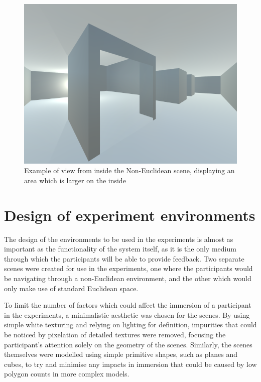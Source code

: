 	\begin{figure}[H]
		\includegraphics[width=1\textwidth]{Images/NE_View}
		\centering
		\caption{Example of view from inside the Non-Euclidean scene, displaying an area which is larger on the inside}
		\label{design:fig:game}
	\end{figure}

	\section[Environment Design]{Design of experiment environments}
	\label{design:design}

		The design of the environments to be used in the experiments is almost as important as the functionality of the system itself, as it is the only medium through which the participants will be able to provide feedback.
		Two separate scenes were created for use in the experiments, one where the participants would be navigating through a non-Euclidean environment, and the other which would only make use of standard Euclidean space. %

		To limit the number of factors which could affect the immersion of a participant in the experiments, a minimalistic aesthetic was chosen for the scenes.
		By using simple white texturing and relying on lighting for definition, impurities that could be noticed by pixelation of detailed textures were removed, focusing the participant's attention solely on the geometry of the scenes.
		Similarly, the scenes themselves were modelled using simple primitive shapes, such as planes and cubes, to try and minimise any impacts in immersion that could be caused by low polygon counts in more complex models.

